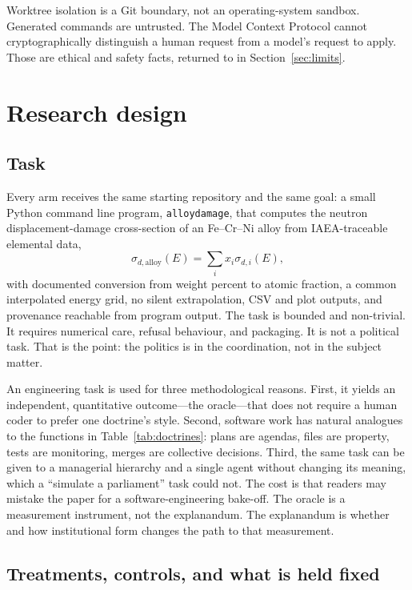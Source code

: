 \documentclass[11pt,a4paper]{article}
\begin{document}
Worktree isolation is a Git boundary, not an operating-system sandbox. Generated commands
are untrusted. The Model Context Protocol cannot cryptographically distinguish a human
request from a model's request to apply. Those are ethical and safety facts, returned to
in Section~\ref{sec:limits}.

\section{Research design}
\label{sec:design}

\subsection{Task}

Every arm receives the same starting repository and the same goal: a small Python command
line program, \texttt{alloydamage}, that computes the neutron displacement-damage
cross-section of an Fe--Cr--Ni alloy from IAEA-traceable elemental data,
\[
\sigma_{d,\mathrm{alloy}}(E)=\sum_{i} x_i\sigma_{d,i}(E),
\]
with documented conversion from weight percent to atomic fraction, a common interpolated
energy grid, no silent extrapolation, CSV and plot outputs, and provenance reachable from
program output. The task is bounded and non-trivial. It requires numerical care,
refusal behaviour, and packaging. It is not a political task. That is the point: the
politics is in the coordination, not in the subject matter.

An engineering task is used for three methodological reasons. First, it yields an
independent, quantitative outcome---the oracle---that does not require a human coder to
prefer one doctrine's style. Second, software work has natural analogues to the
functions in Table~\ref{tab:doctrines}: plans are agendas, files are property, tests are
monitoring, merges are collective decisions. Third, the same task can be given to a
managerial hierarchy and a single agent without changing its meaning, which a
``simulate a parliament'' task could not. The cost is that readers may mistake the paper
for a software-engineering bake-off. The oracle is a measurement instrument, not the
explanandum. The explanandum is whether and how institutional form changes the path to
that measurement.

\subsection{Treatments, controls, and what is held fixed}
\end{document}
